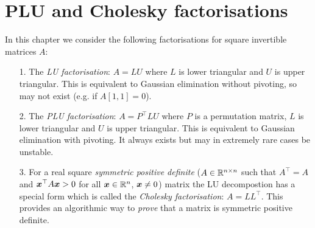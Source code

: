 
\section{PLU and Cholesky factorisations}
In this chapter we consider the following factorisations for square invertible  matrices $A$:

\begin{itemize}
\item[1. ] The \emph{LU factorisation}: $A = LU$ where $L$ is lower triangular and $U$ is upper triangular. This is equivalent to Gaussian elimination without pivoting, so may not exist (e.g. if $A[1,1] = 0$).


\item[2. ] The \emph{PLU factorisation}: $A = P^\ensuremath{\top} LU$ where $P$ is a permutation matrix, $L$ is lower triangular and $U$ is upper triangular. This is equivalent to Gaussian elimination with pivoting. It always exists but may in extremely rare cases be unstable. 


\item[3. ] For a real square \emph{symmetric positive definite} ($A \in {\mathbb R}^{n \times n}$ such that $A^\ensuremath{\top} = A$ and $\bm{{\mbox{\boldmath$x$\unboldmath}}}^\top A \bm{{\mbox{\boldmath$x$\unboldmath}}} > 0$ for all $\bm{{\mbox{\boldmath$x$\unboldmath}}} \in {\mathbb R}^n$, $\bm{{\mbox{\boldmath$x$\unboldmath}}} \neq 0$)  matrix the LU decompostion has a special form which is called the \emph{Cholesky factorisation}: $A = L L^\ensuremath{\top}$. This provides an algorithmic way to \emph{prove} that a matrix is symmetric positive definite.

\end{itemize}
